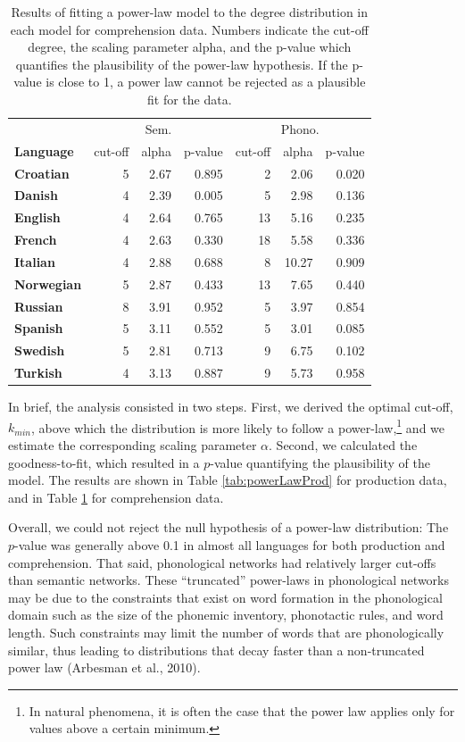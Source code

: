 \documentclass[english,,man,floatsintext]{apa6}
\let\rmarkdownfootnote\footnote%
\def\footnote{\protect\rmarkdownfootnote}
\begin{document}
\begin{table}

\caption{\label{tab:powerLawComp}Results of fitting a power-law model to the degree distribution in each model for comprehension data. Numbers indicate the cut-off degree, the scaling parameter alpha, and the p-value which quantifies the plausibility of the power-law hypothesis. If the p-value is close to 1, a power law cannot be rejected as a plausible fit for the data.}
\centering
\begin{tabular}[t]{>{\bfseries}lrrrrrr}
\toprule
\multicolumn{1}{c}{} & \multicolumn{3}{c}{Sem.} & \multicolumn{3}{c}{Phono.} \\
\cmidrule(l{3pt}r{3pt}){2-4} \cmidrule(l{3pt}r{3pt}){5-7}
Language & cut-off & alpha & p-value & cut-off & alpha & p-value\\
\midrule
Croatian & 5 & 2.67 & 0.895 & 2 & 2.06 & 0.020\\
Danish & 4 & 2.39 & 0.005 & 5 & 2.98 & 0.136\\
English & 4 & 2.64 & 0.765 & 13 & 5.16 & 0.235\\
French & 4 & 2.63 & 0.330 & 18 & 5.58 & 0.336\\
Italian & 4 & 2.88 & 0.688 & 8 & 10.27 & 0.909\\
Norwegian & 5 & 2.87 & 0.433 & 13 & 7.65 & 0.440\\
Russian & 8 & 3.91 & 0.952 & 5 & 3.97 & 0.854\\
Spanish & 5 & 3.11 & 0.552 & 5 & 3.01 & 0.085\\
Swedish & 5 & 2.81 & 0.713 & 9 & 6.75 & 0.102\\
Turkish & 4 & 3.13 & 0.887 & 9 & 5.73 & 0.958\\
\bottomrule
\end{tabular}
\end{table}

In brief, the analysis consisted in two steps. First, we derived the optimal cut-off, \(k_{min}\), above which the distribution is more likely to follow a power-law,\footnote{In natural phenomena, it is often the case that the power law applies only for values above a certain minimum.} and we estimate the corresponding scaling parameter \(\alpha\). Second, we calculated the goodness-to-fit, which resulted in a \(p\)-value quantifying the plausibility of the model. The results are shown in Table \ref{tab:powerLawProd} for production data, and in Table \ref{tab:powerLawComp} for comprehension data.

Overall, we could not reject the null hypothesis of a power-law distribution: The \(p\)-value was generally above 0.1 in almost all languages for both production and comprehension. That said, phonological networks had relatively larger cut-offs than semantic networks. These \enquote{truncated} power-laws in phonological networks may be due to the constraints that exist on word formation in the phonological domain such as the size of the phonemic inventory, phonotactic rules, and word length. Such constraints may limit the number of words that are phonologically similar, thus leading to distributions that decay faster than a non-truncated power law (Arbesman et al., 2010).
\end{document}

